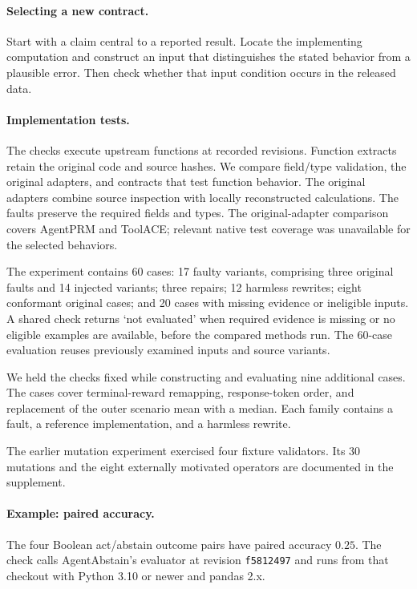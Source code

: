 \documentclass{article}
\begin{document}
\paragraph{Selecting a new contract.}
Start with a claim central to a reported result. Locate the implementing computation and construct an input that distinguishes the stated behavior from a plausible error. Then check whether that input condition occurs in the released data.

\paragraph{Implementation tests.}
The checks execute upstream functions at recorded revisions. Function extracts retain the original code and source hashes. We compare field/type validation, the original adapters, and contracts that test function behavior. The original adapters combine source inspection with locally reconstructed calculations. The faults preserve the required fields and types. The original-adapter comparison covers AgentPRM and ToolACE; relevant native test coverage was unavailable for the selected behaviors.

The experiment contains 60 cases: 17 faulty variants, comprising three original faults and 14 injected variants; three repairs; 12 harmless rewrites; eight conformant original cases; and 20 cases with missing evidence or ineligible inputs. A shared check returns `not evaluated' when required evidence is missing or no eligible examples are available, before the compared methods run. The 60-case evaluation reuses previously examined inputs and source variants.

We held the checks fixed while constructing and evaluating nine additional cases. The cases cover terminal-reward remapping, response-token order, and replacement of the outer scenario mean with a median. Each family contains a fault, a reference implementation, and a harmless rewrite.

The earlier mutation experiment exercised four fixture validators. Its 30 mutations and the eight externally motivated operators are documented in the supplement.

\par\noindent\begin{minipage}{\linewidth}
\paragraph{Example: paired accuracy.}
The four Boolean act/abstain outcome pairs have paired accuracy $0.25$. The check calls AgentAbstain's evaluator at revision \texttt{f5812497} and runs from that checkout with Python 3.10 or newer and pandas 2.x.

\end{minipage}\par
\end{document}
